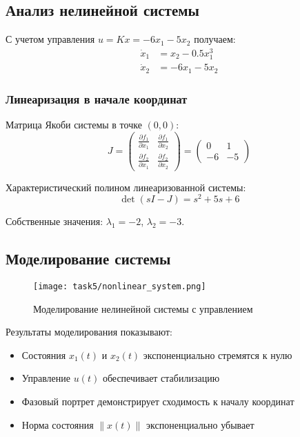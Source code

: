 \subsection*{Анализ нелинейной системы}

С учетом управления $u = Kx = -6x_1 - 5x_2$ получаем:
\begin{align}
\dot{x}_1 &= x_2 - 0.5x_1^3 \\
\dot{x}_2 &= -6x_1 - 5x_2
\end{align}

\subsubsection*{Линеаризация в начале координат}

Матрица Якоби системы в точке $(0,0)$:
\begin{equation}
J = \begin{pmatrix} 
\frac{\partial f_1}{\partial x_1} & \frac{\partial f_1}{\partial x_2} \\
\frac{\partial f_2}{\partial x_1} & \frac{\partial f_2}{\partial x_2}
\end{pmatrix} = \begin{pmatrix} 
0 & 1 \\
-6 & -5
\end{pmatrix}
\end{equation}

Характеристический полином линеаризованной системы:
\begin{equation}
\det(sI - J) = s^2 + 5s + 6
\end{equation}

Собственные значения: $\lambda_1 = -2$, $\lambda_2 = -3$.

\subsection*{Моделирование системы}

\begin{figure}[H]
\centering
\texttt{[image: task5/nonlinear\_system.png]}
\caption{Моделирование нелинейной системы с управлением}
\label{fig:nonlinear_system}
\end{figure}

Результаты моделирования показывают:
\begin{itemize}
\item Состояния $x_1(t)$ и $x_2(t)$ экспоненциально стремятся к нулю
\item Управление $u(t)$ обеспечивает стабилизацию
\item Фазовый портрет демонстрирует сходимость к началу координат
\item Норма состояния $\|x(t)\|$ экспоненциально убывает
\end{itemize}

